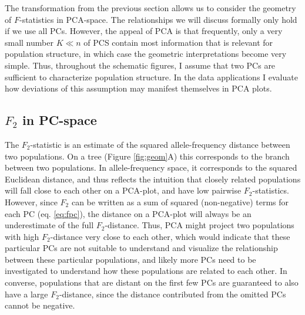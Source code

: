 \documentclass[12pt,fullpage, a4paper]{article}
\begin{document}
The transformation from the previous section allows us to consider the geometry of $F$-statistics in PCA-space. The relationships we will discuss formally only hold if we use all PCs. However, the appeal of PCA is that frequently, only a very small number $K \ll n$ of PCS contain most information that is
relevant for population structure, in which case the geometric interpretations become very simple. Thus, throughout the schematic figures, I assume that two PCs are sufficient to characterize population structure. In the data applications I evaluate how deviations of this assumption may manifest themselves in PCA plots.

\subsection{$F_2$ in PC-space}
The $F_2$-statistic is an estimate of the squared allele-frequency distance between two
populations. On a tree (Figure \ref{fig:geom}A) this corresponds to the branch between two populations. In allele-frequency space, it corresponds to the squared Euclidean distance, and thus reflects the intuition that closely related populations  will fall close to each other on a PCA-plot, and have low pairwise $F_2$-statistics. However, since $F_2$ can be written as  a sum of squared (non-negative) terms for each PC (eq. \ref{eq:fpc}), the distance on a PCA-plot will always be an underestimate of the full $F_2$-distance. Thus, PCA might project two populations with high $F_2$-distance very close to each other, which would indicate that these particular PCs are not suitable to  understand and visualize the relationship between these particular populations, and likely more PCs need to be investigated to understand how these populations are related to each other. In converse, populations that are distant on the first few PCs are guaranteed to also have a large $F_2$-distance, since the distance contributed from the omitted PCs cannot be negative.
\end{document}
